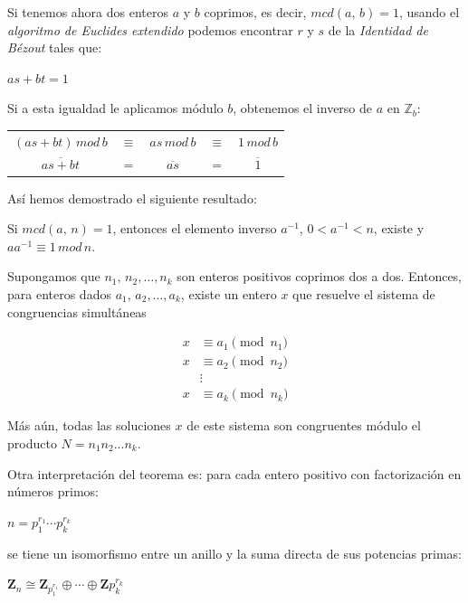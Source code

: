 \hfil

Si tenemos ahora dos enteros $a$ y $b$ coprimos, es decir, $mcd(a,\,b) = 1$, usando el \textit{algoritmo de Euclides extendido} podemos encontrar $r$ y $s$ de la \textit{Identidad de Bézout} tales que:
\begin{center}
	$ as + bt = 1 $
\end{center}

Si a esta igualdad le aplicamos módulo $b$, obtenemos el inverso de $a$ en $\mathbb{Z}_b$:
\begin{center}
	\begin{tabular}{ccccc}
	$  ( as + bt ) \, mod \, b $ & $\equiv $ & $as \, mod \, b $ & $ \equiv$ & $1 \, mod \, b $ \\
	$ \overline{as+bt} $ & $=$ & $\overline{as} $ & $=$ & $\overline{1} $
\end{tabular}
\end{center}

Así hemos demostrado el siguiente resultado:

\begin{proposition}
	Si $mcd(a,\,n) = 1$, entonces el elemento inverso $a^{-1}$, $0<a^{-1}<n$, existe y $a a^{-1} \equiv 1 \, mod \, n$.
\end{proposition}


\hfil


\begin{theorem}
	
	\hfil 
	
	Supongamos que $n_1,\, n_2, …, n_k$
	son enteros positivos coprimos dos a dos. Entonces, para enteros dados $a_1,\, a_2, …, a_k$, existe un
	entero $x$ que resuelve el sistema de congruencias simultáneas
	
	\begin{align*}
	x &\equiv a_1 \pmod{n_1} \\
	x &\equiv a_2 \pmod{n_2} \\
	&\vdots \\
	x &\equiv a_k \pmod{n_k}
	\end{align*}
	
	Más aún, todas las soluciones $x$ de este sistema son congruentes módulo el
	producto $N = n_1 n_2 ... n_k$.
	
	Otra interpretación del teorema es: para cada entero positivo con factorización en números primos:
	
	$n = p_1^{r_1}\cdots p_k^{r_k}$
	
	se tiene un isomorfismo entre un anillo y la suma directa de sus potencias primas:
	
	$\mathbf{Z}_n \cong \mathbf{Z}_{p_1^{r_1}} \oplus \cdots \oplus \mathbf{Z}{p_k^{r_k}}$

\end{theorem}


